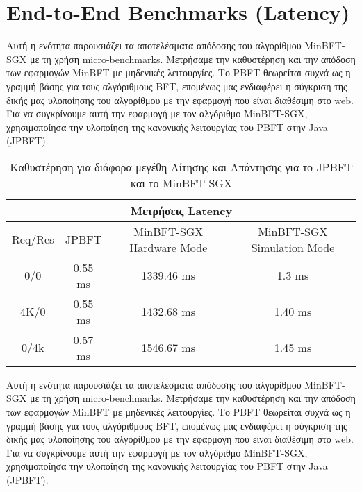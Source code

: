 \section{End-to-End Benchmarks (Latency)}
Αυτή η ενότητα παρουσιάζει τα αποτελέσματα απόδοσης του αλγορίθμου MinBFT-SGX με τη χρήση micro-benchmarks. Μετρήσαμε την καθυστέρηση και την απόδοση των εφαρμογών MinBFT με μηδενικές λειτουργίες. Το PBFT θεωρείται συχνά ως η γραμμή βάσης για τους αλγόριθμους BFT, επομένως μας ενδιαφέρει η σύγκριση της δικής μας υλοποίησης του αλγορίθμου με την εφαρμογή που είναι διαθέσιμη στο web. Για να συγκρίνουμε αυτή την εφαρμογή με τον αλγόριθμο MinBFT-SGX, χρησιμοποίησα την υλοποίηση της κανονικής λειτουργίας του PBFT στην Java (JPBFT).

\vspace{0.3cm}

\begin{table}[h!]
\centering
\begin{tabular}{ | c | c | c | c |}
 \hline
 \multicolumn{4}{|c|}{Μετρήσεις Latency} \\
 \hline
 Req/Res & JPBFT & MinBFT-SGX Hardware Mode & MinBFT-SGX Simulation Mode\\
 \hline
 0/0 & 0.55 ms & 1339.46 ms & 1.3 ms\\
 4K/0 & 0.55 ms & 1432.68 ms & 1.40 ms\\
 0/4k & 0.57 ms & 1546.67 ms & 1.45 ms\\
 \hline
\end{tabular}
\caption{Καθυστέρηση για διάφορα μεγέθη Αίτησης και Απάντησης για το JPBFT και το MinBFT-SGX}
\label{table:latency}
\end{table}


Αυτή η ενότητα παρουσιάζει τα αποτελέσματα απόδοσης του αλγορίθμου MinBFT-SGX με τη χρήση micro-benchmarks. Μετρήσαμε την καθυστέρηση και την απόδοση των εφαρμογών MinBFT με μηδενικές λειτουργίες. Το PBFT θεωρείται συχνά ως η γραμμή βάσης για τους αλγόριθμους BFT, επομένως μας ενδιαφέρει η σύγκριση της δικής μας υλοποίησης του αλγορίθμου με την εφαρμογή που είναι διαθέσιμη στο web. Για να συγκρίνουμε αυτή την εφαρμογή με τον αλγόριθμο MinBFT-SGX, χρησιμοποίησα την υλοποίηση της κανονικής λειτουργίας του PBFT στην Java (JPBFT).


